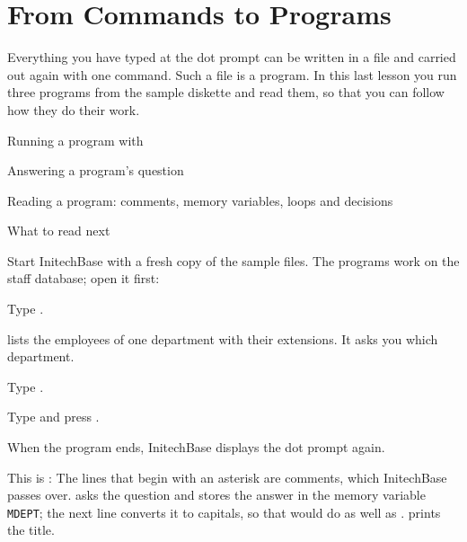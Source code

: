 \chapter{From Commands to Programs}
Everything you have typed at the dot prompt can be written in a file and
carried out again with one command.  Such a file is a program.  In this last
lesson you run three programs from the sample diskette and read them, so that
you can follow how they do their work.

\begin{ChapterCovers}
\item Running a program with 
\item Answering a program's question
\item Reading a program: comments, memory variables, loops and decisions
\item What to read next
\end{ChapterCovers}

Start InitechBase with a fresh copy of the sample files.  The programs work on
the staff database; open it first:
\begin{Steps}
\item Type .
\end{Steps}

 lists the employees of one department with their
extensions.  It asks you which department.
\begin{Steps}[resume]
\item Type .
\item Type  and press .
\end{Steps}
When the program ends, InitechBase displays the dot prompt again.

This is :
The lines that begin with an asterisk are comments, which InitechBase passes
over.   asks the question and stores the answer in the memory
variable \texttt{MDEPT}; the next line converts it to capitals, so that
 would do as well as .   prints the title.

